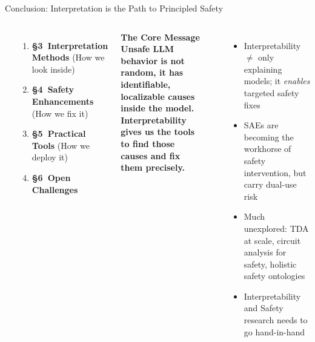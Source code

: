 \begin{frame}{Conclusion: Interpretation is the Path to Principled Safety}
  \vspace*{0.1cm}
  \begin{columns}[T]
    {\small\bfseries{}}
    \begin{enumerate}\scriptsize\setlength\itemsep{5pt}
      \item \textbf{\S3\ Interpretation Methods} (How we look inside)\\
      \item \textbf{\S4\ Safety Enhancements} (How we fix it)\\
      \item \textbf{\S5\ Practical Tools} (How we deploy it)\\
      \item \textbf{\S6\ Open Challenges}\\
    \end{enumerate}

    \begin{ucrdark}[UCRnavy]
      \centering\small\bfseries
      The Core Message\\[6pt]
      \normalfont\scriptsize
      Unsafe LLM behavior is not random, it has \textbf{identifiable, localizable causes} inside the model.\\[6pt]
      Interpretability gives us the tools to \textbf{find} those causes and \textbf{fix them precisely}.
    \end{ucrdark}
    \vspace{0.4em}
    {\small\bfseries{}}
    \begin{itemize}\scriptsize\setlength\itemsep{3pt}
      \item Interpretability $\not=$ only explaining models; it \emph{enables} targeted safety fixes
      \item SAEs are becoming the workhorse of safety intervention, but carry dual-use risk
      \item Much unexplored: TDA at scale, circuit analysis for safety, holistic safety ontologies
      \item Interpretability and Safety research needs to go hand-in-hand
    \end{itemize}
  \end{columns}
\end{frame}


